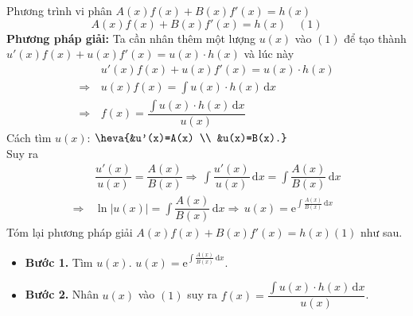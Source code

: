 \begin{dang}{Phương trình vi phân \boldmath $A(x)f(x)+B(x)f'(x)=h(x)$ \unboldmath}
	$$A(x)f(x)+B(x)f'(x)=h(x)\quad (1)$$
	\textbf{Phương pháp giải:} Ta cần nhân thêm một lượng $u(x)$ vào  $(1)$ để tạo thành $u'(x) f(x)+u(x) f'(x)=u(x) \cdot h(x)$ và lúc này
		      \begin{align*}
			                      & \, u'(x) f(x)+u(x) f'(x)=u(x) \cdot h(x)   \\ 
			      \Rightarrow     & \, u(x) f(x)=\int u(x) \cdot h(x) \mathrm{\,d} x                                   \\
			      \Rightarrow     & \, f(x)=\dfrac{\int u(x) \cdot h(x) \mathrm{\,d} x}{u(x)}
		      \end{align*}
	Cách tìm $u(x)$: $\heva{&u'(x)=A(x) \\ &u(x)=B(x).}$\\
		      Suy ra
		      \begin{align*}
			                  & \,\dfrac{u'(x)}{u(x)}=\dfrac{A(x)}{B(x)}                                                                    
			      \Rightarrow \, \int \dfrac{u'(x)}{u(x)} \mathrm{\,d} x=\int \dfrac{A(x)}{B(x)} \mathrm{\,d} x \\
			      \Rightarrow & \, \ln |u(x)|=\int \dfrac{A(x)}{B(x)} \mathrm{\,d} x                                           
			      \Rightarrow \, u(x)=\mathrm{e}^{\int\tfrac{A(x)}{B(x)} \mathrm{\,d} x}
		      \end{align*}
	Tóm lại phương pháp giải $A(x)f(x)+B(x)f'(x)=h(x)$\quad $(1)$ như sau.
	\begin{itemize}
		\item \textbf{Bước 1.} Tìm $u(x)$. $u(x)=\mathrm{e}^{\int\tfrac{A(x)}{B(x)} \mathrm{\,d} x}$.
		\item \textbf{Bước 2.} Nhân $u(x)$ vào $(1)$ suy ra $f(x)=\dfrac{\int\limits u(x) \cdot h(x) \mathrm{\,d}x}{u(x)}$.
	\end{itemize}

\end{dang}
